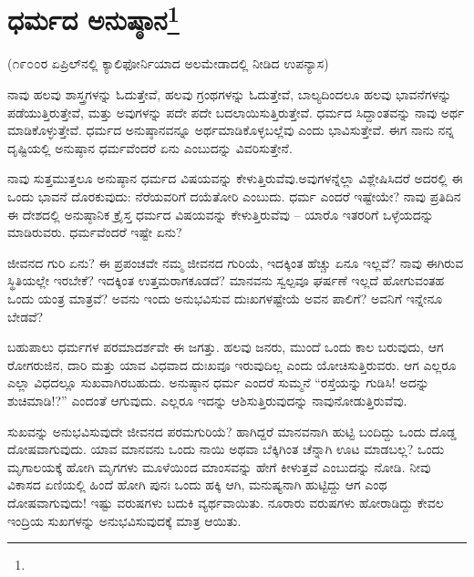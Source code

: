 
\chapter[ಧರ್ಮದ ಅನುಷ್ಠಾನ]{ಧರ್ಮದ ಅನುಷ್ಠಾನ\protect\footnote{}}

\begin{center}
(೧೯೦೦ರ ಏಪ್ರಿಲ್‌ನಲ್ಲಿ ಕ್ಯಾಲಿಫೋರ್ನಿಯಾದ ಅಲಮೇಡಾದಲ್ಲಿ ನೀಡಿದ ಉಪನ್ಯಾಸ)
\end{center}

\vskip 3pt

ನಾವು ಹಲವು ಶಾಸ್ತ್ರಗಳನ್ನು ಓದುತ್ತೇವೆ, ಹಲವು ಗ್ರಂಥಗಳನ್ನು ಓದುತ್ತೇವೆ, ಬಾಲ್ಯದಿಂದಲೂ ಹಲವು ಭಾವನೆಗಳನ್ನು ಪಡೆಯುತ್ತಿರುತ್ತೇವೆ, ಮತ್ತು ಅವುಗಳನ್ನು ಪದೇ ಪದೇ ಬದಲಾಯಿಸುತ್ತಿರುತ್ತೇವೆ. ಧರ್ಮದ ಸಿದ್ದಾಂತವನ್ನು ನಾವು ಅರ್ಥ ಮಾಡಿಕೊಳ್ಳುತ್ತೇವೆ. ಧರ್ಮದ ಅನುಷ್ಠಾನವನ್ನೂ ಅರ್ಥಮಾಡಿಕೊಳ್ಳಬಲ್ಲೆವು ಎಂದು ಭಾವಿಸುತ್ತೇವೆ. ಈಗ ನಾನು ನನ್ನ ದೃಷ್ಟಿಯಲ್ಲಿ ಅನುಷ್ಠಾನ ಧರ್ಮವೆಂದರೆ ಏನು ಎಂಬುದನ್ನು ವಿವರಿಸುತ್ತೇನೆ.

\vskip 3pt

ನಾವು ಸುತ್ತಮುತ್ತಲೂ ಅನುಷ್ಠಾನ ಧರ್ಮದ ವಿಷಯವನ್ನು ಕೇಳುತ್ತಿರುವೆವು.\break ಅವುಗಳನ್ನೆಲ್ಲಾ ವಿಶ್ಲೇಷಿಸಿದರೆ ಅದರಲ್ಲಿ ಈ ಒಂದು ಭಾವನೆ ದೊರಕುವುದು: ನೆರೆಯವರಿಗೆ ದಯೆತೋರಿ ಎಂಬುದು. ಧರ್ಮ ಎಂದರೆ ಇಷ್ಟೇಯೇ? ನಾವು ಪ್ರತಿದಿನ ಈ ದೇಶದಲ್ಲಿ ಅನುಷ್ಠಾನಿಕ ಕ್ರೈಸ್ತ ಧರ್ಮದ ವಿಷಯವನ್ನು ಕೇಳುತ್ತಿರುವೆವು – ಯಾರೊ ಇತರರಿಗೆ ಒಳ್ಳೆಯದನ್ನು ಮಾಡಿರುವರು. ಧರ್ಮವೆಂದರೆ ಇಷ್ಟೇ ಏನು?

\vskip 3pt

ಜೀವನದ ಗುರಿ ಏನು? ಈ ಪ್ರಪಂಚವೇ ನಮ್ಮ ಜೀವನದ ಗುರಿಯೆ, ಇದಕ್ಕಿಂತ ಹೆಚ್ಚು ಏನೂ ಇಲ್ಲವೆ? ನಾವು ಈಗಿರುವ ಸ್ಥಿತಿಯಲ್ಲೇ ಇರಬೇಕೆ? ಇದಕ್ಕಿಂತ ಉತ್ತಮರಾಗಕೂಡದೆ? ಮಾನವನು ಸ್ವಲ್ಪವೂ ಘರ್ಷಣೆ ಇಲ್ಲದೆ ಹೋಗುವಂತಹ ಒಂದು ಯಂತ್ರ ಮಾತ್ರವೆ? ಅವನು ಇಂದು ಅನುಭವಿಸುವ ದುಃಖಗಳಷ್ಟೇಯೆ ಅವನ ಪಾಲಿಗೆ? ಅವನಿಗೆ ಇನ್ನೇನೂ ಬೇಡವೆ?

\vskip 3pt

ಬಹುಪಾಲು ಧರ್ಮಗಳ ಪರಮಾದರ್ಶವೇ ಈ ಜಗತ್ತು. ಹಲವು ಜನರು, ಮುಂದೆ ಒಂದು ಕಾಲ ಬರುವುದು, ಆಗ ರೋಗರುಜಿನ, ದಾರಿ ಮತ್ತು ಯಾವ ವಿಧವಾದ ದುಃಖವೂ ಇರುವುದಿಲ್ಲ ಎಂದು ಯೋಚಿಸುತ್ತಿರುವರು. ಆಗ ಎಲ್ಲರೂ ಎಲ್ಲಾ ವಿಧದಲ್ಲೂ ಸುಖವಾಗಿರಬಹುದು. ಅನುಷ್ಠಾನ ಧರ್ಮ ಎಂದರೆ ಸುಮ್ಮನೆ “ರಸ್ತೆಯನ್ನು ಗುಡಿಸಿ! ಅದನ್ನು ಶುಚಿಮಾಡಿ!?” ಎಂದಂತೆ ಆಗುವುದು. ಎಲ್ಲರೂ ಇದನ್ನು ಆಶಿಸುತ್ತಿರುವುದನ್ನು ನಾವು\break ನೋಡುತ್ತಿರುವೆವು.

\vskip 3pt

ಸುಖವನ್ನು ಅನುಭವಿಸುವುದೇ ಜೀವನದ ಪರಮಗುರಿಯೆ? ಹಾಗಿದ್ದರೆ ಮಾನವನಾಗಿ ಹುಟ್ಟಿ ಬಂದಿದ್ದು ಒಂದು ದೊಡ್ಡ ದೋಷವಾಗುವುದು. ಯಾವ ಮಾನವನು ಒಂದು ನಾಯಿ ಅಥವಾ ಬೆಕ್ಕಿಗಿಂತ ಚೆನ್ನಾಗಿ ಊಟ ಮಾಡಬಲ್ಲ? ಒಂದು ಮೃಗಾಲಯಕ್ಕೆ ಹೋಗಿ ಮೃಗಗಳು ಮೂಳೆಯಿಂದ ಮಾಂಸವನ್ನು ಹೇಗೆ ಕೀಳುತ್ತವೆ ಎಂಬುದನ್ನು ನೋಡಿ. ನೀವು ವಿಕಾಸದ ಏಣಿಯಲ್ಲಿ ಹಿಂದೆ ಹೋಗಿ ಪುನಃ ಒಂದು ಹಕ್ಕಿ ಆಗಿ, ಮನುಷ್ಯನಾಗಿ ಹುಟ್ಟಿದ್ದು ಆಗ ಎಂಥ ದೋಷವಾಗುವುದು! ಇಷ್ಟು ವರುಷಗಳು ಬದುಕಿ ವ್ಯರ್ಥವಾಯಿತು. ನೂರಾರು ವರುಷಗಳು ಹೋರಾಡಿದ್ದು ಕೇವಲ ಇಂದ್ರಿಯ ಸುಖಗಳನ್ನು ಅನುಭವಿಸುವುದಕ್ಕೆ ಮಾತ್ರ ಆಯಿತು.

